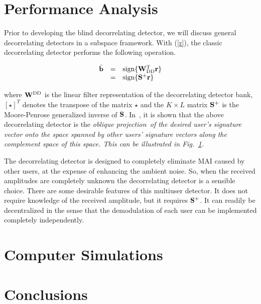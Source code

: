 \documentclass[a4paper,11pt,fleqn]{article}
\newcommand{\br}{{\mathbf r}}
\newcommand{\bb}{{\bf b}}
\newcommand{\bS}{{\bf S}}
\newcommand{\bW}{{\bf W}}
\begin{document}
\pagebreak

\section{Performance Analysis}

Prior to developing the blind decorrelating detector, we will
discuss general decorrelating detectors in a subspace framework.
With (\ref{r}), the classic decorrelating detector performs the
following operation.

\begin{equation}
\begin{array}{rcl}
\hat\bb&=&\mbox{sign}\{\bW_{\rm DD}^{\rm T}\br\}\\
 &=&\mbox{sign}\{\bS^+\br\}
\end{array}
\end{equation}

\noindent where $\bW^{\rm DD}$ is the linear filter representation
of the decorrelating detector bank, $[\star]^T$ denotes the
transpose of the matrix $\star$ and the $K\times L$ matrix $\bS^+$
is the Moore-Penrose generalized inverse of $\bS$.
In~\cite{Elda02}, it is shown that the above decorrelating
detector is the \em oblique projection\rm\ of the desired user's
signature vector onto the space spanned by other users' signature
vectors along the complement space of this space. This can be
illustrated in Fig.~\ref{DD_geometric}.

\begin{figure}
\label{DD_geometric}
\end{figure}


The decorrelating detector is designed to completely eliminate MAI
caused by other users, at the expense of enhancing the ambient
noise. So, when the received amplitudes are completely unknown the
decorrelating detector is a sensible choice. There are some
desirable features of this multiuser detector. It does not require
knowledge of the received amplitude, but it requires $\bS^+$. It
can readily be decentralized in the sense that the demodulation of
each user can be implemented completely independently.

\pagebreak

\section{Computer Simulations}
\pagebreak

\section{Conclusions}
\pagebreak


\end{document}
